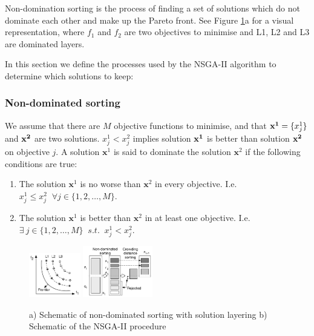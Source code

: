 \documentclass[sigconf]{acmart}
\begin{document}
Non-domination sorting is the process of finding a set of solutions which do not dominate each other and make up the Pareto front. See Figure \ref{fig:pareto-layering}a for a visual representation, where $f_1$ and $f_2$ are two objectives to minimise and L1, L2 and L3 are dominated layers.


In this section we define the processes used by the NSGA-II algorithm to determine which solutions to keep:
\subsubsection{Non-dominated sorting}
We assume that there are $M$ objective functions to minimise, and that ${\bf x^{1}} = \{x_j^{1}\}$ and $\bf x^{2}$ are two solutions. $x_j^{1}<x_j^{2}$ implies solution $\bf x^{1}$ is better than solution $\bf x^{2}$ on objective $j$. A solution $\mathbf{x}^{1}$ is said to dominate the solution $\mathbf{x}^{2}$ if the following conditions are true:
\begin{enumerate}
  \item The solution $\mathbf{x}^{1}$ is no worse than $\mathbf{x}^{2}$ in every objective. I.e. $x^{1}_j \leq x^{2}_j \;\;  \forall j \in\{1,2,\ldots,M\}$.
  \item The solution $\mathbf{x}^{1}$ is better than $\mathbf{x}^{2}$ in at least one objective. I.e. $\exists\  {j}\in \{ 1,2,\ldots,M\} \;\; s.t. \;\;x^{1}_j < x^{2}_j$.
\end{enumerate}



\begin{figure}[t] 
  \vskip -10pt
  \center
  \includegraphics[width=0.2\textwidth]{figures/carbon_optimiser/paretofrontier/paretofrontier}
  \includegraphics[width=0.270\textwidth]{figures/carbon_optimiser/algsketch/sketch2}
  \vskip -8pt
  \caption{a) Schematic of non-dominated sorting with solution layering b) Schematic of the NSGA-II procedure}
  \label{fig:pareto-layering}
  \vskip -15pt
\end{figure}
\end{document}
